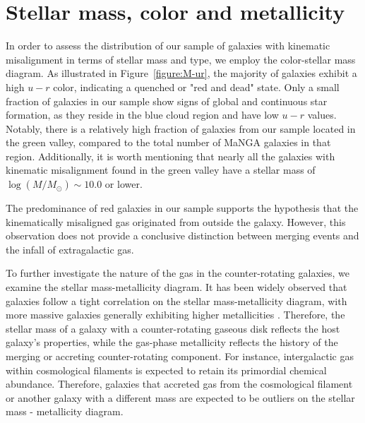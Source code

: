 \documentclass[12pt,preprint]{aa}
\begin{document}
\section{Stellar mass, color and metallicity}
\label{sect:M-ur-OH}

In order to assess the distribution of our sample of galaxies with kinematic misalignment in terms of stellar mass and type, we employ the color-stellar mass diagram. As illustrated in Figure~\ref{figure:M-ur}, the majority of galaxies exhibit a high $u-r$ color, indicating a quenched or "red and dead" state. Only a small fraction of galaxies in our sample show signs of global and continuous star formation, as they reside in the blue cloud region and have low $u-r$ values. Notably, there is a relatively high fraction of galaxies from our sample located in the green valley, compared to the total number of MaNGA galaxies in that region. Additionally, it is worth mentioning that nearly all the galaxies with kinematic misalignment found in the green valley have a stellar mass of $\log(M/M_\odot) \sim 10.0$ or lower.

The predominance of red galaxies in our sample supports the hypothesis that the kinematically misaligned gas originated from outside the galaxy. However, this observation does not provide a conclusive distinction between merging events and the infall of extragalactic gas.

To further investigate the nature of the gas in the counter-rotating galaxies, we examine the stellar mass-metallicity diagram. It has been widely observed that galaxies follow a tight correlation on the stellar mass-metallicity diagram, with more massive galaxies generally exhibiting higher metallicities \citep{AndrewsMartini2013, Zinchenko2019, Zinchenko2021}. Therefore, the stellar mass of a galaxy with a counter-rotating gaseous disk reflects the host galaxy's properties, while the gas-phase metallicity reflects the history of the merging or accreting counter-rotating component. For instance, intergalactic gas within cosmological filaments is expected to retain its primordial chemical abundance. Therefore, galaxies that accreted gas from the cosmological filament or another galaxy with a different mass are expected to be outliers on the stellar mass - metallicity diagram. 
\end{document}
